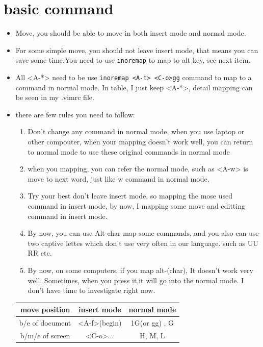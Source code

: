 \documentclass[a4paper,12pt,twoside]{book}
\begin{document}
\section{basic command}
	\begin{itemize}
	\item Move, you should be able to move in both insert mode and normal mode.
	\item For some simple move, you should not leave insert mode, that means you can save some time.You need to use \verb!inoremap! to map to alt key, see next item.

	\item All <A-*> need to be use \verb!inoremap <A-t> <C-o>gg! command to map to a command in normal mode. In table, I just keep <A-*>, detail mapping can be seen in my .vimrc file. 

	\item there are few rules you need to follow:
			\begin{enumerate}
					\item Don't change any command in normal mode, when you use laptop or other compouter, when your mapping doesn't work well, you can return to normal mode to use these original commands in normal mode
					\item when you mapping, you can refer the normal mode, such as <A-w> is move to next word, just like w command in normal mode.
					\item Try your best don't leave insert mode, so mapping the mose used command in insert mode, by now, I mapping some move and editting command in insert mode.
					\item By now, you can use Alt-char map some commands, and you also can use two captive lettes which don't use very often in our language. such as UU RR etc. 
					\item By now, on some computers, if you map alt-(char), It doesn't work very well. Sometimes, when you press it,it will go into the normal mode. I don't have time to investigate right now. 
			\end{enumerate}


	\begin{center}
		\begin{tabular}{c|c|c}
		\hline 
        move position & insert mode & normal mode \\

		\hline
		b/e of document &  <A-f>(begin)  & 1G(or gg) , G  \\

	    \hline 
		b/m/e of screen & <C-o>... & H, M, L \\


\end{tabular}
\end{center}
\end{itemize}
\end{document}
